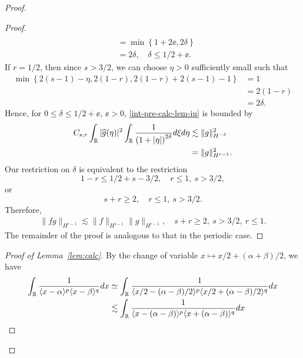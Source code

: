 \begin{proof}
\begin{proof}
\begin{equation*}
\begin{split}
\\
& = \min\left\{ 1 + 2 \ee, 2 \delta\right\}
\\
& = 2 \delta, \quad \delta \le 1/2 + \ee.
\end{split}
\end{equation*}
%
If $r = 1/2$, then since $s > 3/2$, we can choose $\eta > 0$ sufficiently small
such that
%
%
\begin{equation*}
\begin{split}
\min\left\{ 2(s-1) -\eta , 2(1-r), 2(1-r) + 2(s-1) - 1  \right\}
& = 1 
\\
& = 2(1 -r)
\\
& = 2\delta.
\end{split}
\end{equation*}
%
Hence, for $0 \le \delta \le 1/2 + \ee$, $\ee >
0$, \eqref{int-pre-calc-lem-iu} is bounded by
\begin{equation*}
\begin{split}
C_{s,r} \int_{\mathbb{R}}  | \widehat{g}(\eta) |^{2} \int_{\mathbb{R}} \frac{1}{\left( 1
+ |\eta| \right )^{2 \delta}} d \xi d \eta 
& \lesssim
\| g \|_{H^{-\delta}}^{2}
\\
& = \| g \|_{H^{r-1}}^{2}.
\end{split}
\end{equation*}
%
Our restriction on $\delta$ is equivalent to the restriction 
$$1-r \le 1/2 + s - 3/2, \quad r \le 1, \ s > 3/2,$$ or
$$s + r \ge 2,  \quad  r \le 1, \ s > 3/2.$$ Therefore, 
%
%
%
%
\begin{equation*}
\begin{split}
\| f g \|_{H^{r-1}} \lesssim \| f \|_{H^{s-1}} \| g \|_{H^{r-1}},
\quad s + r \ge 2, \ s > 3/2, \ r \le 1.
\end{split}
\end{equation*}
%
%
The remainder of the proof is analogous to that in the periodic case.
\end{proof}
%
%
%
\begin{proof}[Proof of Lemma~\ref{lem:calc}]
%
By the change of variable $x \mapsto x/2 + (\alpha + \beta)/2$, we have
%
%
\begin{equation}
\label{rur}
\begin{split}
\int_{\rr} \frac{1}{\langle x - \alpha \rangle^{p} \langle  x -
\beta
\rangle^{q}}d x
& \simeq \int_{\rr} \frac{1}{\langle x/2 - (\alpha - \beta)/2  \rangle^{p}
\langle  x/2 + (\alpha - \beta)/2 \rangle^{q}} d x
\\
& \lesssim \int_{\rr} \frac{1}{\langle x - (\alpha - \beta)  \rangle^{p}
\langle  x + (\alpha - \beta) \rangle^{q}} d x

\end{split}
\end{equation}
\end{proof}
\end{proof}
